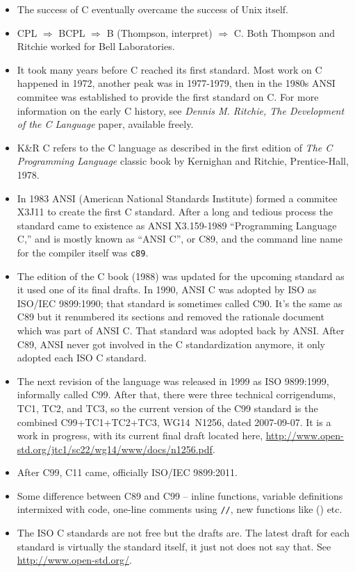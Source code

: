 \begin{itemize}
\item The success of C eventually overcame the success of Unix itself.
\item CPL $\Rightarrow$ BCPL $\Rightarrow$ B (Thompson, interpret)
$\Rightarrow$ C.  Both Thompson and Ritchie worked for Bell Laboratories.
\item It took many years before C reached its first standard.  Most work on C
happened in 1972, another peak was in 1977-1979, then in the 1980s ANSI commitee
was established to provide the first standard on C.  For more information on the
early C history, see \emph{Dennis M. Ritchie, The Development of the C Language}
paper, available freely.
\item K\&R C refers to the C language as described in the first edition of
\emph{The C Prog\-ramm\-ing Language} classic book by Kernighan and Ritchie,
Prentice-Hall, 1978.
\item In 1983 ANSI (American National Standards Institute) formed a commitee
X3J11 to create the first C standard.  After a long and tedious process the
standard came to existence as ANSI X3.159-1989 ``Programming Language C,'' and
is mostly known as ``ANSI C'', or C89, and the command line name for the
compiler itself was \texttt{c89}.
\item The  edition of the C book (1988) was updated for the upcoming
standard as it used one of its final drafts.  In 1990, ANSI C was adopted by ISO
as ISO/IEC 9899:1990; that standard is sometimes called C90.  It's the same as
C89 but it renumbered its sections and removed the rationale document which was
part of ANSI C.  That standard was adopted back by ANSI.  After C89, ANSI never
got involved in the C standardization anymore, it only adopted each ISO C
standard.
\item The next revision of the language was released in 1999 as ISO 9899:1999,
informally called C99.  After that, there were three technical corrigendums,
TC1, TC2, and TC3, so the current version of the C99 standard is the combined
C99+TC1+TC2+TC3, WG14~N1256, dated 2007-09-07.  It is a work in progress,
with its current final draft located here,
\url{http://www.open-std.org/jtc1/sc22/wg14/www/docs/n1256.pdf}.
\item After C99, C11 came, officially ISO/IEC 9899:2011.
\item Some difference between C89 and C99 -- inline functions, variable
definitions intermixed with code, one-line comments using \texttt{//}, new
functions like () etc.
\item The ISO C standards are not free but the drafts are.  The latest draft for
each standard is virtually the standard itself, it just not does not say that.
See \url{http://www.open-std.org/}.
\end{itemize}

